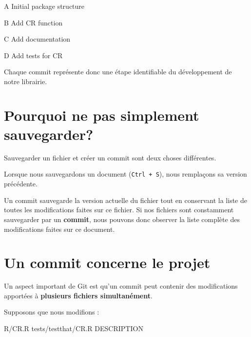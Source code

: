 \documentclass[
  letterpaper,
  DIV=11,
  numbers=noendperiod]{scrreprt}
\newenvironment{Shaded}{\begin{snugshade}}{\end{snugshade}}
\newcommand{\NormalTok}[1]{\textcolor[rgb]{0.00,0.23,0.31}{#1}}
\begin{document}
\begin{Shaded}
\begin{Highlighting}[]
\NormalTok{A    Initial package structure}

\NormalTok{B    Add CR function}

\NormalTok{C    Add documentation}

\NormalTok{D    Add tests for CR}
\end{Highlighting}
\end{Shaded}

Chaque commit représente donc une étape identifiable du développement de
notre librairie.

\section*{Pourquoi ne pas simplement
sauvegarder?}\label{pourquoi-ne-pas-simplement-sauvegarder}


Sauvegarder un fichier et créer un commit sont deux choses différentes.

Lorsque nous sauvegardons un document (\texttt{Ctrl\ +\ S}), nous
remplaçons sa version précédente.

Un commit sauvegarde la version actuelle du fichier tout en conservant
la liste de toutes les modifications faites sur ce fichier. Si nos
fichiers sont constamment sauvegarder par un \textbf{commit}, nous
pouvons donc observer la liste complète des modifications faites sur ce
document.

\section*{Un commit concerne le
projet}\label{un-commit-concerne-le-projet}


Un aspect important de Git est qu'un commit peut contenir des
modifications apportées à \textbf{plusieurs fichiers simultanément}.

Supposons que nous modifions :

\begin{Shaded}
\begin{Highlighting}[]
\NormalTok{R/CR.R}
\NormalTok{tests/testthat/CR.R}
\NormalTok{DESCRIPTION}
\end{Highlighting}
\end{Shaded}
\end{document}
